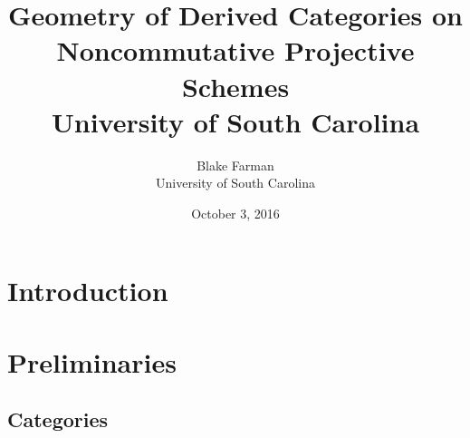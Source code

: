 \documentclass[10pt,draft]{book}
\author{Blake Farman\\University of South Carolina}
\title{
  {Geometry of Derived Categories on Noncommutative Projective Schemes}\\
  {University of South Carolina}
}
\date{October 3, 2016}
\begin{document}
\maketitle

\tableofcontents

\newtheorem{thm}{Theorem}[section]
\newtheorem{lem}[thm]{Lemma}
\newtheorem{cor}[thm]{Corollary}
\newtheorem{prop}[thm]{Proposition}

\theoremstyle{definition}
\newtheorem{defn}[thm]{Definition}
\newtheorem{rmk}[thm]{Remark}
\newtheorem{eg}[thm]{Example}

\chapter{Introduction}
\chapter{Preliminaries}
\section{Categories}
%
%
%
%
%
%
%
%
%
%
%
\end{document}
